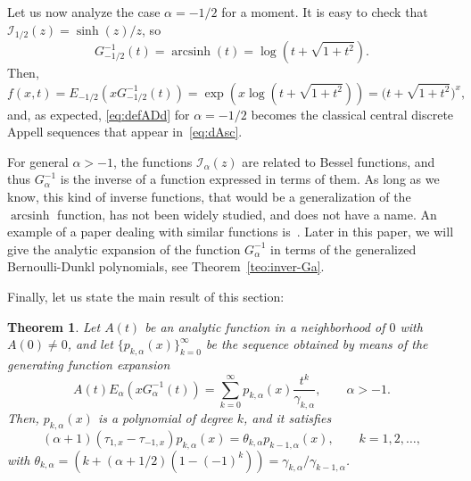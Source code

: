 \documentclass[11pt]{article}
\theoremstyle{plain}
\newtheorem{theorem}{Theorem}[section]
\theoremstyle{remark}
\numberwithin{equation}{section} %
\newcommand{\Ea}{E_{\alpha}}
\newcommand{\arcsinh}{\operatorname{arcsinh}}
\newcommand{\I}{\mathcal{I}}
\newcommand{\cc}{\gamma}
\begin{document}
Let us now analyze the case $\alpha=-1/2$ for a moment.
It is easy to check that $\I_{1/2}(z) = \sinh(z)/z$, so 
\[
  G_{-1/2}^{-1}(t) = \arcsinh(t) = \log(t+\sqrt{1+t^2}).
\]
Then, 
\[
  f(x,t) = E_{-1/2}(x G_{-1/2}^{-1}(t)) 
  = \exp(x \log(t+\sqrt{1+t^2})) = \big(t+\sqrt{1+t^2})^x,
\]
and, as expected, \eqref{eq:defADd} for $\alpha=-1/2$ becomes the classical central discrete Appell sequences that appear in~\eqref{eq:dAsc}.

For general $\alpha>-1$, the functions $\I_{\alpha}(z)$ are related to Bessel functions, and thus $G_{\alpha}^{-1}$ is the inverse of a function expressed in terms of them. As long as we know, this kind of inverse functions, that would be a generalization of the $\arcsinh$ function, has not been widely studied, and does not have a name. An example of a paper dealing with similar functions is~\cite{Gold}.
Later in this paper, we will give the analytic expansion of the function $G_{\alpha}^{-1}$ in terms of the generalized Bernoulli-Dunkl polynomials, see Theorem~\ref{teo:inver-Ga}.

Finally, let us state the main result of this section:

\begin{theorem}
\label{teo:defADdis}
Let $A(t)$ be an analytic function in a neighborhood of $0$ with $A(0) \ne 0$, and let $\{p_{k,\alpha}(x)\}_{k=0}^{\infty}$ be the sequence obtained by means of the generating function expansion
\begin{equation}
\label{eq:defADdis} 
  A(t) \Ea(x G_{\alpha}^{-1}(t)) = \sum_{k=0}^{\infty} p_{k,\alpha}(x) \frac{t^k}{\cc_{k,\alpha}},
  \qquad \alpha > -1.
\end{equation}
Then, $p_{k,\alpha}(x)$ is a polynomial of degree $k$, and it satisfies
\begin{equation}
\label{eq:tau1-1pk}
  (\alpha+1)(\tau_{1,x}-\tau_{-1,x}) p_{k,\alpha}(x) = \theta_{k,\alpha} p_{k-1,\alpha}(x),
  \qquad k=1,2,\ldots,
\end{equation}
with $\theta_{k,\alpha} = (k+(\alpha+1/2)(1-(-1)^k)) = \cc_{k,\alpha}/\cc_{k-1,\alpha}$.
\end{theorem}
\end{document}
